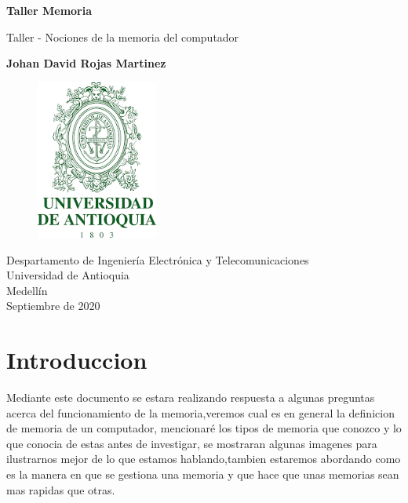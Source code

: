 \documentclass{article}
\begin{document}
\begin{titlepage}
    \begin{center}
        \vspace*{1cm}
            
        \Huge
        \textbf{Taller Memoria}
            
        \vspace{0.5cm}
        \LARGE
        Taller - Nociones de la memoria del computador
            
        \vspace{1.5cm}
            
        \textbf{Johan David Rojas Martinez}
            
        \vfill
            
        \vspace{0.8cm}
       
        \Large
\begin{figure}[h]
\includegraphics[width=4cm]{logoudea.png}
\centering
\end{figure}

        \vfill
        Despartamento de Ingeniería Electrónica y Telecomunicaciones\\
        Universidad de Antioquia\\
        Medellín\\
        Septiembre de 2020
                 
    \end{center}
\end{titlepage}

\tableofcontents

\section{Introduccion}
\noindent
Mediante este documento se estara realizando respuesta a algunas preguntas acerca del funcionamiento de la memoria,veremos cual es en general la definicion de memoria de un computador, mencionaré los tipos de memoria que conozco y lo que conocia de estas antes de investigar, se mostraran algunas imagenes para ilustrarnos mejor de lo que estamos hablando,tambien estaremos abordando como es la manera en que se gestiona una memoria y que hace que unas memorias sean mas rapidas que otras. 
\end{document}
